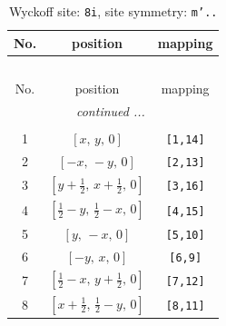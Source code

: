 \documentclass[fleqn,8pt]{jsarticle}
\begin{document}
\renewcommand{\arraystretch}{1.2}
\begin{longtable}{ccc}
\caption{Wyckoff site: {\tt 8i}, site symmetry: {\tt m'..}}
 \\
 \hline \hline
No. & position & mapping \\ \hline \endfirsthead

\multicolumn{2}{l}{\tablename\ \thetable{}} \\
 \hline \hline
No. & position & mapping \\ \hline \endhead

 \hline \hline
\multicolumn{2}{r}{\footnotesize\it continued ...} \\ \endfoot

 \hline \hline
\multicolumn{2}{r}{} \\ \endlastfoot

1 & $\left[ x,\, y,\, 0 \right]$ & {\tt [1,14]} \\ \hline
2 & $\left[ - x,\, - y,\, 0 \right]$ & {\tt [2,13]} \\ \hline
3 & $\left[ y + \frac{1}{2},\, x + \frac{1}{2},\, 0 \right]$ & {\tt [3,16]} \\ \hline
4 & $\left[ \frac{1}{2} - y,\, \frac{1}{2} - x,\, 0 \right]$ & {\tt [4,15]} \\ \hline
5 & $\left[ y,\, - x,\, 0 \right]$ & {\tt [5,10]} \\ \hline
6 & $\left[ - y,\, x,\, 0 \right]$ & {\tt [6,9]} \\ \hline
7 & $\left[ \frac{1}{2} - x,\, y + \frac{1}{2},\, 0 \right]$ & {\tt [7,12]} \\ \hline
8 & $\left[ x + \frac{1}{2},\, \frac{1}{2} - y,\, 0 \right]$ & {\tt [8,11]} \\
\end{longtable}
\renewcommand{\arraystretch}{1.2}
\end{document}
